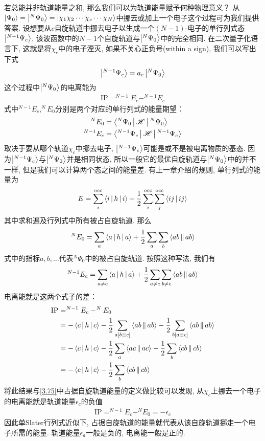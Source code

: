 若总能并非轨道能量之和, 
那么我们可以为轨道能量赋予何种物理意义？
从$\Ket{\Psi_0}=\Ket{^N\Psi_0}=\Ket{\chi_1\chi_2\cdots\chi_c\cdots\chi_N}$中挪去或加上一个电子这个过程可为我们提供答案. 
设想要从$c$自旋轨道中挪去电子以生成一个$(N-1)$-电子的单行列式态$\Ket{^{N-1}\Psi_c}$, 
该波函数中的$N-1$个自旋轨道与$\Ket{^N\Psi_0}$中的完全相同. 
在二次量子化语言下, 
这就是将$\chi_c$中的电子湮灭, 
如果不关心正负号(within a sign), 
我们可以写出下式
\begin{align}
	\Ket{^{N-1}\Psi_c} = a_c\Ket{^N\Psi_0}
\end{align}
这个过程中$\Ket{^N\Psi_0}$的电离能为
\begin{align}
	\mathrm{IP} = ^{N-1}E_c - ^{N-1}E_c
\end{align}
式中$^{N-1}E_c,^{N}E_0$分别是两个对应的单行列式的能量期望：
\begin{align}
	^{N}E_0  & = \Braket{^N\Psi_0|\mathscr{H}|^N\Psi_0}\\
	^{N-1}E_c&= \Braket{^{N-1}\Psi_c|\mathscr{H}|^{N-1}\Psi_c}
\end{align}
取决于要从哪个轨道$\chi_c$中挪去电子, 
$\Ket{^{N-1}\Psi_c}$可能是或不是被电离物质的基态. 
因为$\Ket{^{N-1}\Psi_c}$与$\Ket{^N\Psi_0}$并是相同状态, 
所以一般它的最优自旋轨道与$\Ket{^N\Psi_0}$中的并不一样, 
但是我们可以计算两个态之间的能量差. 
有上一章介绍的规则, 
单行列式的能量为
\begin{align}
	\label{3.87}
	E = \sum_i^\mathrm{occ} \Braket{i|h|i} + \frac{1}{2}\sum^\mathrm{occ}_i\sum^\mathrm{occ}_j\Braket{ij|ij}
\end{align}
其中求和遍及行列式中所有被占自旋轨道. 
那么
\begin{align}
	\label{3.88}
	^NE_0 = \sum_a\Braket{a|h|a} + \frac{1}{2}\sum_a\sum_b\Braket{ab||ab}
\end{align}
式中的指标$a,b,\ldots$代表$^N\Psi_0$中的被占自旋轨道. 
按照这种写法, 
我们有
\begin{align}
	^{N-1}E_c = \sum_{a\neq c}\Braket{a|h|a} + \frac{1}{2}\sum_{a\neq c}\sum_{b\neq c}\Braket{ab||ab}
\end{align}
电离能就是这两个式子的差：
\begin{align}
	\mathrm{IP} & = ^{N-1}E_c - ^NE_0\notag\\
	& = -\Braket{c|h|c} - \frac{1}{2}\sum_{a[b\equiv c]}\Braket{ab||ab}- \frac{1}{2}\sum_{b[a\equiv c]}\Braket{ab||ab}\notag\\
	& = -\Braket{c|h|c} - \frac{1}{2}\sum_{a}\Braket{ac||ac}- \frac{1}{2}\sum_{b}\Braket{cb||cb}\notag\\
	& = -\Braket{c|h|c} - \frac{1}{2}\sum_{b}\Braket{cb||cb}
\end{align}
将此结果与\autoref{3.75}中占据自旋轨道能量的定义做比较可以发现, 
从$\chi_c$上挪去一个电子的电离能就是轨道能量$\epsilon_c$的负值
\begin{align}
	\mathrm{IP} = ^{N-1}E_c - ^NE_0 = -\epsilon_c
\end{align}
因此单Slater行列式近似下, 
占据自旋轨道的能量就代表从该自旋轨道挪走一个电子所需的能量. 
轨道能量$\epsilon_a$一般是负的, 
电离能一般是正的.

